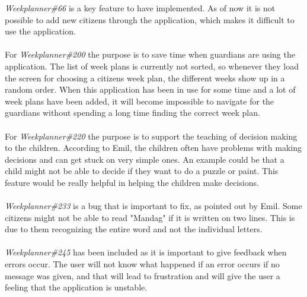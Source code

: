 \noindent
\textit{Weekplanner\#66} is a key feature to have implemented. 
As of now it is not possible to add new citizens through the application, which makes it difficult to use the application. 
\\\\
For \textit{Weekplanner\#200} the purpose is to save time when guardians are using the application. 
The list of week plans is currently not sorted, so whenever they load the screen for choosing a citizens week plan, the different weeks show up in a random order. 
When this application has been in use for some time and a lot of week plans have been added, it will become impossible to navigate for the guardians without spending a long time finding the correct week plan.
\\\\
For \textit{Weekplanner\#220} the purpose is to support the teaching of decision making to the children.
According to Emil, the children often have problems with making decisions and can get stuck on very simple ones. 
An example could be that a child might not be able to decide if they want to do a puzzle or paint.
This feature would be really helpful in helping the children make decisions.
\\\\
\textit{Weekplanner\#233} is a bug that is important to fix, as pointed out by Emil.
Some citizens might not be able to read "Mandag" if it is written on two lines. 
This is due to them recognizing the entire word and not the individual letters.
\\\\
\textit{Weekplanner\#245} has been included as it is important to give feedback when errors occur. 
The user will not know what happened if an error occurs if no message was given, and that will lead to frustration and will give the user a feeling that the application is unstable.

